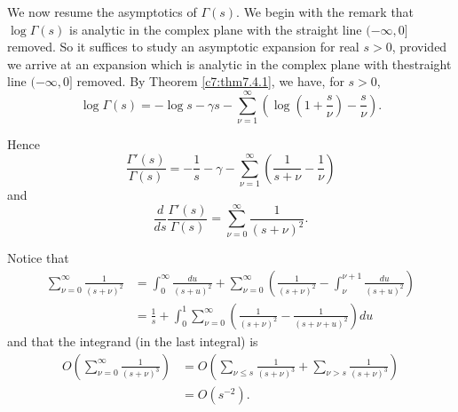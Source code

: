 We now resume the asymptotics of $\Gamma(s)$. We begin with the remark
that $\log\Gamma(s)$ is analytic in the complex plane with the
straight line $(-\infty,0]$ removed. So it suffices to study an
  asymptotic expansion for real $s>0$, provided we arrive at an
  expansion which is analytic in the complex plane with
  the\pageoriginale straight line $(-\infty,0]$ removed. By Theorem
    \ref{c7:thm7.4.1}, we have, for $s>0$,
$$
\log \Gamma(s)=-\log s-\gamma
s-\sum^{\infty}_{\nu=1}\left(\log\left(1+\frac{s}{\nu}\right)-\frac{s}{\nu}\right). 
$$

Hence
$$
\frac{\Gamma'(s)}{\Gamma(s)}=-\frac{1}{s}-\gamma-\sum^{\infty}_{\nu=1}\left(\frac{1}{s+\nu}-\frac{1}{\nu}\right) 
$$
and
\begin{equation*}
\frac{d}{ds}\frac{\Gamma'(s)}{\Gamma(s)}=\sum^{\infty}_{\nu=0}\frac{1}{(s+\nu)^{2}}.\tag{7.4.2.}\label{c7:eq7.4.2}
\end{equation*}

Notice that
\begin{align*}
\sum^{\infty}_{\nu=0}\frac{1}{(s+\nu)^{2}} &=
\int^{\infty}_{0}\frac{du}{(s+u)^{2}}+\sum^{\infty}_{\nu=0}\left(\frac{1}{(s+\nu)^{2}}-\int^{\nu+1}_{\nu}\frac{du}{(s+u)^{2}}\right)\\ 
&=
\frac{1}{s}+\int^{1}_{0}\sum^{\infty}_{\nu=0}\left(\frac{1}{(s+\nu)^{2}}-\frac{1}{(s+\nu+u)^{2}}\right)du 
\end{align*}
and that the integrand (in the last integral) is
\begin{align*}
O\left(\sum^{\infty}_{\nu=0}\frac{1}{(s+\nu)^{3}}\right) &=
O\left(\sum_{\nu\leq
  s}\frac{1}{(s+\nu)^{3}}+\sum_{\nu>s}\frac{1}{(s+\nu)^{3}}\right)\\ 
&= O(s^{-2}).
\end{align*}

